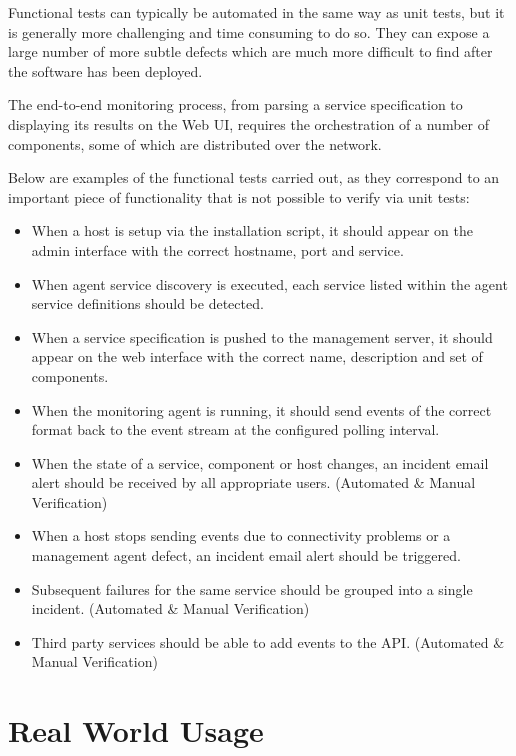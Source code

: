 \documentclass{cshonours}
\begin{document}
Functional tests can typically be automated in the same way as unit tests, but it is generally more challenging and time consuming to do so. They can expose a large number of more subtle defects which are much more difficult to find after the software has been deployed.

The end-to-end monitoring process, from parsing a service specification to displaying its results on the Web UI, requires the orchestration of a number of components, some of which are distributed over the network.

Below are examples of the functional tests carried out, as they correspond to an important piece of functionality that is not possible to verify via unit tests:

\begin{itemize}
  \item When a host is setup via the installation script, it should appear on the admin interface with the correct hostname, port and service.
  \item When agent service discovery is executed, each service listed within the agent service definitions should be detected.
  \item When a service specification is pushed to the management server, it should appear on the web interface with the correct name, description and set of components.
  \item When the monitoring agent is running, it should send events of the correct format back to the event stream at the configured polling interval.
  \item When the state of a service, component or host changes, an incident email alert should be received by all appropriate users. (Automated \& Manual Verification)
  \item When a host stops sending events due to connectivity problems or a management agent defect, an incident email alert should be triggered.
  \item Subsequent failures for the same service should be grouped into a single incident. (Automated \& Manual Verification)
  \item Third party services should be able to add events to the API. (Automated \& Manual Verification)
\end{itemize}

\section{Real World Usage}
\end{document}
